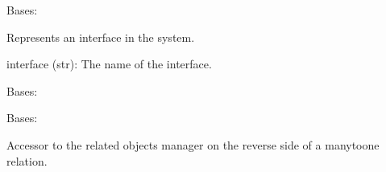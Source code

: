 \documentclass[letterpaper,10pt,english]{sphinxmanual}
\begin{document}
\begin{fulllineitems}
\label{\detokenize{app:app.models.interfaces}}
\pysigstartsignatures
{}
\pysigstopsignatures
\sphinxAtStartPar
Bases: 

\sphinxAtStartPar
Represents an interface in the system.
\begin{description}
\sphinxAtStartPar
interface (str): The name of the interface.

\end{description}

\begin{fulllineitems}
\label{\detokenize{app:app.models.interfaces.DoesNotExist}}
\pysigstartsignatures
{}
\pysigstopsignatures
\sphinxAtStartPar
Bases: 

\end{fulllineitems}


\begin{fulllineitems}
\label{\detokenize{app:app.models.interfaces.MultipleObjectsReturned}}
\pysigstartsignatures
{}
\pysigstopsignatures
\sphinxAtStartPar
Bases: 

\end{fulllineitems}


\begin{fulllineitems}
\label{\detokenize{app:app.models.interfaces.connected}}
\pysigstartsignatures
{}
\pysigstopsignatures
\sphinxAtStartPar
Accessor to the related objects manager on the reverse side of a
many\sphinxhyphen{}to\sphinxhyphen{}one relation.


\end{fulllineitems}
\end{fulllineitems}
\end{document}
